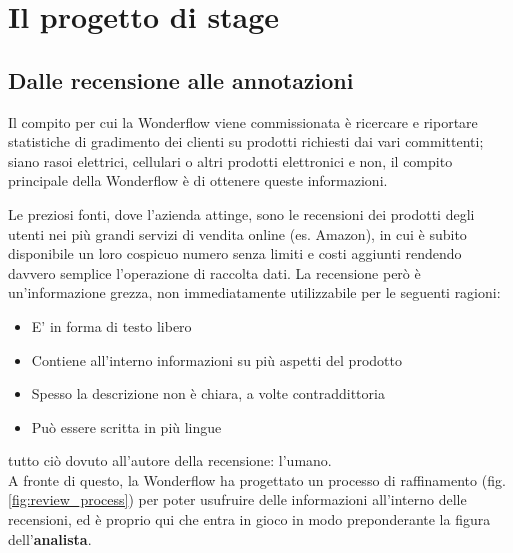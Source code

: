 
\chapter{Il progetto di stage}
\label{cap:progetto-stage}

\section{Dalle recensione alle annotazioni}
Il compito per cui la Wonderflow viene commissionata è ricercare e riportare
statistiche di gradimento dei clienti su prodotti richiesti dai vari
committenti; siano rasoi elettrici, cellulari o altri prodotti elettronici e
non, il compito principale della Wonderflow è di ottenere queste informazioni.

Le preziosi fonti, dove l'azienda attinge, sono le recensioni dei prodotti
degli utenti nei più grandi servizi di vendita online (es. Amazon), in cui è
subito disponibile un loro cospicuo numero senza limiti e costi aggiunti
rendendo davvero semplice l'operazione di raccolta dati. La recensione
però è un'informazione grezza, non immediatamente utilizzabile per le seguenti
ragioni:
\begin{itemize}
\item E' in forma di testo libero
\item Contiene all'interno informazioni su più aspetti del prodotto
\item Spesso la descrizione non è chiara, a volte contraddittoria
\item Può essere scritta in più lingue
\end{itemize}

tutto ciò dovuto all'autore della recensione: l'umano. \\

A fronte di questo, la Wonderflow ha progettato un processo di raffinamento
(fig. \ref{fig:review_process}) per poter usufruire delle informazioni
all'interno delle recensioni, ed è proprio qui che entra in gioco in modo
preponderante la figura dell'\textbf{analista}.

